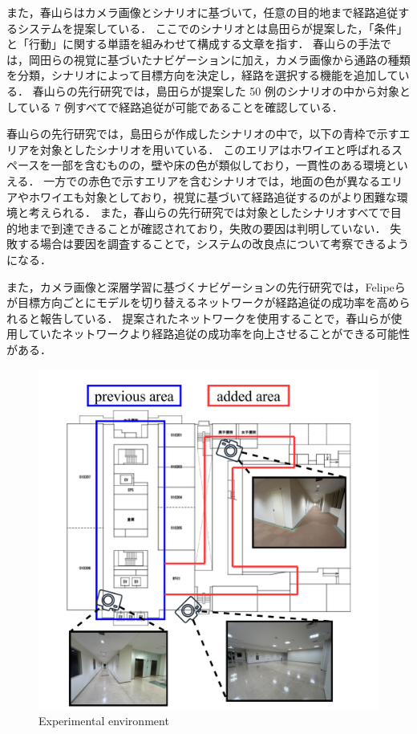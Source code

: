 また，春山ら\cite{haruyama2023}はカメラ画像とシナリオに基づいて，任意の目的地まで経路追従するシステムを提案している．
ここでのシナリオとは島田ら\cite{shimada2020}が提案した，「条件」と「行動」に関する単語を組みわせて構成する文章を指す．
春山らの手法では，岡田らの視覚に基づいたナビゲーションに加え，カメラ画像から通路の種類を分類，シナリオによって目標方向を決定し，経路を選択する機能を追加している．
春山らの先行研究では，島田らが提案した 50 例のシナリオの中から対象としている 7 例すべてで経路追従が可能であることを確認している．

春山らの先行研究では，島田らが作成したシナリオの中で，以下の青枠で示すエリアを対象としたシナリオを用いている．
このエリアはホワイエと呼ばれるスペースを一部を含むものの，壁や床の色が類似しており，一貫性のある環境といえる．
一方での赤色で示すエリアを含むシナリオでは，地面の色が異なるエリアやホワイエも対象としており，視覚に基づいて経路追従するのがより困難な環境と考えられる．
また，春山らの先行研究では対象としたシナリオすべてで目的地まで到達できることが確認されており，失敗の要因は判明していない．
失敗する場合は要因を調査することで，システムの改良点について考察できるようになる．

また，カメラ画像と深層学習に基づくナビゲーションの先行研究では，Felipeらが目標方向ごとにモデルを切り替えるネットワークが経路追従の成功率を高められると報告している．
提案されたネットワークを使用することで，春山らが使用していたネットワークより経路追従の成功率を向上させることができる可能性がある．

\begin{figure}[htbp]
     \centering
     \includegraphics[width=130mm]{images/pdf/ishiguro/cit3f.pdf}
     \caption{Experimental environment}
     \label{fig:cit3f}
\end{figure}

\newpage
